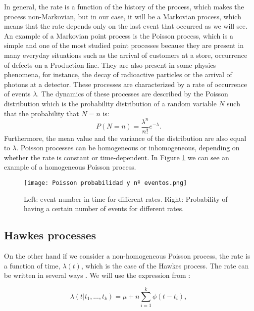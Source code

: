 In general, the rate is a function of the history of the process, which makes the process non-Markovian, but in our case, it will be a Markovian process, which means that the rate depends 
only on the last event that occurred as we will see. An example of a Markovian point process is the Poisson process, which is a simple and one of the most studied point processes because 
they are present in many everyday situations such as the arrival of customers at a store, occurrence of defects on a Production line. They are also present in some physics phenomena,
for instance, the decay of radioactive particles or the arrival of photons at a detector. These processes are characterized by a rate of occurrence of events $\lambda$.
The dynamics of these processes are described by the Poisson distribution which is the probability distribution of a random variable $N$ such that the probability that $N= n$ is:
\begin{equation}
    P(N=n) = \dfrac{\lambda^n}{n!}e^{-\lambda}.
    \label{eq: Probabilidad proceso de Poisson homogéneo}
\end{equation}
Furthermore, the mean value and the variance of the distribution are also equal to $\lambda$. Poisson processes can be homogeneous or inhomogeneous, depending on whether the rate is constant
or time-dependent. In Figure \ref{f:poisson} we can see an example of a homogeneous Poisson process.

\begin{figure}[H]
    \centering
    \texttt{[image: Poisson probabilidad y nº eventos.png]}
    \caption{Left: event number in time for different rates. Right: Probability of having a certain number of events for different rates.}
    \label{f:poisson}
\end{figure}

\subsection{Hawkes processes} \label{subsec:Hawkes_processes}

On the other hand if we consider a non-homogeneous Poisson process, the rate is a function of time, $\lambda(t)$, which is the case of the Hawkes process. The rate can be written in several 
ways \cite{notarmuzi2021percolation,kanazawa2021ubiquitous,dassios2013exact,laub2021elements}. We will use the expression from \cite{notarmuzi2021percolation}:

\begin{equation}
    \lambda(t|t_1, \ldots, t_k) = \mu + n\sum_{i=1}^k \phi (t-t_i),
    \label{eq: Hawkes rate}
\end{equation}

